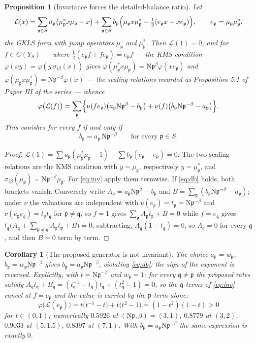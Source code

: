 \documentclass[11pt]{amsart}
\numberwithin{equation}{section}
\newtheorem{proposition}[theorem]{Proposition}
\newtheorem{corollary}[theorem]{Corollary}
\theoremstyle{definition}
\theoremstyle{remark}
\newcommand{\cL}{\mathcal{L}}
\newcommand{\pp}{\mathfrak{p}}
\newcommand{\qq}{\mathfrak{q}}
\newcommand{\Ns}{\mathrm{N}}
\begin{document}
\begin{proposition}[Invariance forces the detailed-balance ratio]\label{prop:balance}
Let
\[
\cL(x)=\sum_{\pp\in S}a_\pp\bigl(\mu_\pp^*x\mu_\pp-x\bigr)+\sum_{\pp\in S}b_\pp\Bigl(\mu_\pp x\mu_\pp^*-\tfrac12(e_\pp x+xe_\pp)\Bigr),
\qquad e_\pp=\mu_\pp\mu_\pp^* ,
\]
the GKLS form with jump operators $\mu_\pp$ and $\mu_\pp^*$. Then $\cL(1)=0$, and for
$f\in C(Y_S)$ --- where $\tfrac12(e_\pp f+fe_\pp)=e_\pp f$ --- the KMS condition
$\varphi(xy)=\varphi(y\,\sigma_{i\beta}(x))$ gives
$\varphi(\mu_\pp^*x\mu_\pp)=\Ns\pp^{\beta}\varphi(xe_\pp)$ and
$\varphi(\mu_\pp x\mu_\pp^*)=\Ns\pp^{-\beta}\varphi(x)$ --- the scaling relations recorded
as Proposition 5.1 of Paper III of the series --- whence
\begin{equation}\label{eq:inv}
\varphi\bigl(\cL(f)\bigr)=\sum_{\pp}\Bigl\{\nu(fe_\pp)\bigl(a_\pp\Ns\pp^{\beta}-b_\pp\bigr)
+\nu(f)\bigl(b_\pp\Ns\pp^{-\beta}-a_\pp\bigr)\Bigr\}.
\end{equation}
This vanishes for every $f$ if and only if
\begin{equation}\label{eq:db}
b_\pp=a_\pp\,\Ns\pp^{+\beta}\qquad\text{for every }\pp\in S .
\end{equation}
\end{proposition}

\begin{proof}
$\cL(1)=\sum a_\pp(\mu_\pp^*\mu_\pp-1)+\sum b_\pp(e_\pp-e_\pp)=0$. The two scaling relations
are the KMS condition with $y=\mu_\pp$, respectively $y=\mu_\pp^*$, and
$\sigma_{i\beta}(\mu_\pp)=\Ns\pp^{-\beta}\mu_\pp$. For \eqref{eq:inv} apply them termwise.
If \eqref{eq:db} holds, both brackets vanish. Conversely write
$A_\pp=a_\pp\Ns\pp^\beta-b_\pp$ and $B=\sum_\pp(b_\pp\Ns\pp^{-\beta}-a_\pp)$; under $\nu$
the valuations are independent with $\nu(e_\pp)=t_\pp=\Ns\pp^{-\beta}$ and
$\nu(e_\pp e_{\qq})=t_\pp t_{\qq}$ for $\pp\ne\qq$, so $f=1$ gives
$\sum_\pp A_\pp t_\pp+B=0$ while $f=e_{\qq}$ gives
$t_{\qq}\bigl(A_{\qq}+\sum_{\pp\ne\qq}A_\pp t_\pp+B\bigr)=0$; subtracting,
$A_{\qq}(1-t_{\qq})=0$, so $A_{\qq}=0$ for every $\qq$, and then $B=0$ term by term.
\end{proof}

\begin{corollary}[The proposed generator is not invariant]\label{cor:signerror}
The choice $a_\pp=w_\pp$, $b_\pp=w_\pp\Ns\pp^{-\beta}$ gives
$b_\pp=a_\pp\Ns\pp^{-\beta}$, violating \eqref{eq:db}: the sign of the exponent is
reversed. Explicitly, with $t=\Ns\pp^{-\beta}$ and $w_\pp=1$: for every $\qq\ne\pp$ the
proposed rates satisfy $A_\qq t_\qq+B_\qq=(t_\qq^{-1}-t_\qq)t_\qq+(t_\qq^2-1)=0$, so the
$\qq$-terms of \eqref{eq:inv} cancel at $f=e_\pp$ and the value is carried by the
$\pp$-term alone:
\[
\varphi\bigl(\cL(e_\pp)\bigr)=t\bigl(t^{-1}-t\bigr)+t\bigl(t^2-1\bigr)=(1-t^2)(1-t)>0
\]
for $t\in(0,1)$; numerically $0.5926$ at $(\Ns\pp,\beta)=(3,1)$, $0.8779$ at $(3,2)$,
$0.9033$ at $(5,1.5)$, $0.8397$ at $(7,1)$. With $b_\pp=a_\pp\Ns\pp^{+\beta}$ the same
expression is exactly $0$.
\end{corollary}
\end{document}

